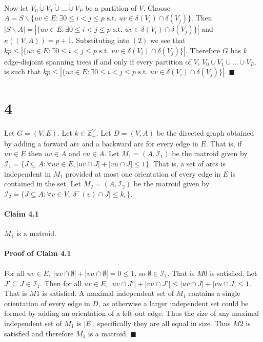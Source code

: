\documentclass[letterpaper,12pt,oneside,onecolumn]{report}
\begin{document}
\paragraph{}
Now let $V_0 \dot\cup V_1 \dot\cup \dots \dot\cup V_P$ be a partition of $V$. Choose $A =S \backslash \{uv \in E : \exists 0\leq i < j \leq p \text{ s.t. } uv \in \delta(V_i) \cap \delta(V_j) \}$. Then $|S\backslash A| = |\{uv \in E : \exists 0\leq i < j \leq p \text{ s.t. } uv \in \delta(V_i) \cap \delta(V_j) \}|$ and $\kappa((V,A)) = p+1$. Substituting into $(2)$ we see that $kp \leq |\{uv \in E : \exists 0\leq i < j \leq p \text{ s.t. } uv \in \delta(V_i) \cap \delta(V_j) \}|$. Therefore $G$ has $k$ edge-disjoint spanning trees if and only if every partition of $V$, $V_0 \dot\cup V_1 \dot\cup \dots \dot\cup V_P$, is such that $kp \leq |\{uv \in E : \exists 0\leq i < j \leq p \text{ s.t. } uv \in \delta(V_i) \cap \delta(V_j) \}|$. $\blacksquare$

\section*{4}
\paragraph{}
Let $G = (V,E)$. Let $k \in \mathbb{Z}_+^V$. Let $D = (V, A)$ be the directed graph obtained by adding a forward arc and a backward arc for every edge in $E$. That is, if $uv \in E$ then $uv \in A$ and $vu \in A$. Let $M_1 = (A, \mathcal{I}_1)$ be the matroid given by $\mathcal{I}_1 = \{J \subseteq A : \forall uv \in E, |uv \cap J| + |vu \cap J| \leq 1 \}$. That is, a set of arcs is independent in $M_1$ provided at most one orientation of every edge in $E$ is contained in the set. Let $M_2 = (A, \mathcal{I}_2)$ be the matroid given by $\mathcal{I}_2 = \{ J \subseteq A : \forall v \in V, |\delta^-(v) \cap J| \leq k_v\}$.
\paragraph{Claim 4.1}
$M_1$ is a matroid.
\paragraph{Proof of Claim 4.1}
For all $uv \in E$, $|uv \cap \emptyset| + |vu \cap \emptyset| = 0 \leq 1$, so $\emptyset \in \mathcal{I}_1$. That is $M0$ is satisfied. Let $J' \subseteq J \in \mathcal{I}_1$. Then for all $uv \in E$, $|uv \cap J'| + |vu \cap J'| \leq |uv \cap J| + |vu \cap J| \leq 1$. That is $M1$ is satisfied. A maximal independent set of $M_1$ contains a single orientation of every edge in $D$, as otherwise a larger independent set could be formed by adding an orientation of a left out edge. Thus the size of any maximal independent set of $M_1$ is $|E|$, specifically they are all equal in size. Thus $M2$ is satisfied and therefore $M_1$ is a matroid. $\blacksquare$
\end{document}
